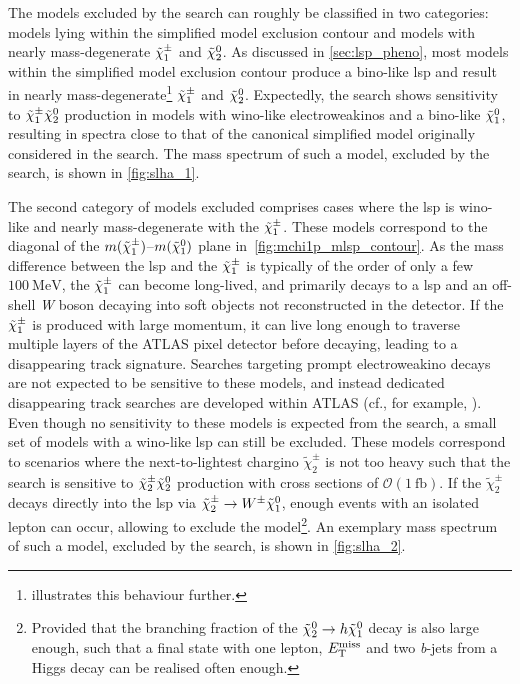 The models excluded by the \onelepton search can roughly be classified in two categories: models lying within the simplified model exclusion contour and models with nearly mass-degenerate $\tilde{\chi}_1^\pm$ and $\tilde{\chi}_2^0$.
As discussed in \cref{sec:lsp_pheno}, most models within the simplified model exclusion contour produce a bino-like \gls{lsp} and result in nearly mass-degenerate\footnote{ illustrates this behaviour further.} $\tilde{\chi}_1^\pm$ and $\tilde{\chi}_2^0$.
Expectedly, the \onelepton search shows sensitivity to $\tilde{\chi}_1^\pm\tilde{\chi}_2^0$ production in models with wino-like electroweakinos and a bino-like $\tilde{\chi}_1^0$, resulting in spectra close to that of the canonical simplified model originally considered in the search.
The mass spectrum of such a model, excluded by the \onelepton search, is shown in \cref{fig:slha_1}.

The second category of models excluded comprises cases where the \gls{lsp} is wino-like and nearly mass-degenerate with the $\tilde{\chi}_1^\pm$. These models correspond to the diagonal of the $m(\tilde{\chi}_1^\pm)$--$m(\tilde{\chi}_1^0)$ plane in~\cref{fig:mchi1p_mlsp_contour}. As the mass difference between the \gls{lsp} and the $\tilde{\chi}_1^\pm$ is typically of the order of only a few $\SI{100}{\MeV}$, the $\tilde{\chi}_1^\pm$ can become long-lived, and primarily decays to a \gls{lsp} and an off-shell \textit{W} boson decaying into soft objects not reconstructed in the detector.
If the $\tilde{\chi}_1^\pm$ is produced with large momentum, it can live long enough to traverse multiple layers of the ATLAS pixel detector before decaying, leading to a disappearing track signature. Searches targeting prompt electroweakino decays are not expected to be sensitive to these models, and instead dedicated disappearing track searches are developed within ATLAS (cf., for example, \cite{ATLAS-CONF-2021-015}). 
Even though no sensitivity to these models is expected from the \onelepton search, a small set of models with a wino-like \gls{lsp} can still be excluded. These models correspond to scenarios where the next-to-lightest chargino $\tilde{\chi}^\pm_2$ is not too heavy such that the \onelepton search is sensitive to $\tilde{\chi}^\pm_2\tilde{\chi}_2^0$ production with cross sections of $\mathcal{O}(\SI{1}{\femto\barn})$.
If the $\tilde{\chi}^\pm_2$ decays directly into the \gls{lsp} via $\tilde{\chi}^\pm_2 \rightarrow W^\pm \tilde{\chi}_1^0$, enough events with an isolated lepton can occur, allowing to exclude the model\footnote{Provided that the branching fraction of the $\tilde{\chi}_2^0 \rightarrow h \tilde{\chi}_1^0$ decay is also large enough, such that a final state with one lepton, $E_{\textrm{T}}^{\textrm{miss}}$ and two \textit{b}-jets from a Higgs decay can be realised often enough.}. An exemplary mass spectrum of such a model, excluded by the \onelepton search, is shown in \cref{fig:slha_2}.

